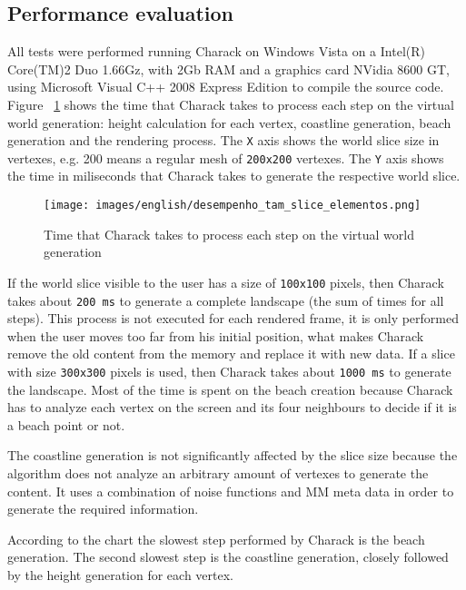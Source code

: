 \documentclass[10pt, conference, compsocconf]{IEEEtran}
\begin{document}
\subsection{Performance evaluation}

All tests were performed running Charack on Windows Vista on a Intel(R) Core(TM)2 Duo 1.66Gz, with 2Gb RAM and a graphics card NVidia 8600 GT, using Microsoft Visual C++ 2008 Express Edition to compile the source code. Figure ~\ref{fig:desempenho_tam_slice_elementos} shows the time that Charack takes to process each step on the virtual world generation: height calculation for each vertex, coastline generation, beach generation and the rendering process. The {\tt X} axis shows the world slice size in vertexes, e.g. 200 means a regular mesh of {\tt 200x200} vertexes. The {\tt Y} axis shows the time in miliseconds that Charack takes to generate the respective world slice.

\begin{figure}
\centering
\texttt{[image: images/english/desempenho\_tam\_slice\_elementos.png]}
\caption{Time that Charack takes to process each step on the virtual world generation}
\label{fig:desempenho_tam_slice_elementos}
\end{figure}

If the world slice visible to the user has a size of {\tt 100x100} pixels, then Charack takes about {\tt 200 ms} to generate a complete landscape (the sum of times for all steps). This process is not executed for each rendered frame, it is only performed when the user moves too far from his initial position, what makes Charack remove the old content from the memory and replace it with new data. If a slice with size {\tt 300x300} pixels is used, then Charack takes about {\tt 1000 ms} to generate the landscape. Most of the time is spent on the beach creation because Charack has to analyze each vertex on the screen and its four neighbours to decide if it is a beach point or not.

The coastline generation is not significantly affected by the slice size because the algorithm does not analyze an arbitrary amount of vertexes to generate the content. It uses a combination of noise functions and MM meta data in order to generate the required information.

According to the chart the slowest step performed by Charack is the beach generation. The second slowest step is the coastline generation, closely followed by the height generation for each vertex.
\end{document}
